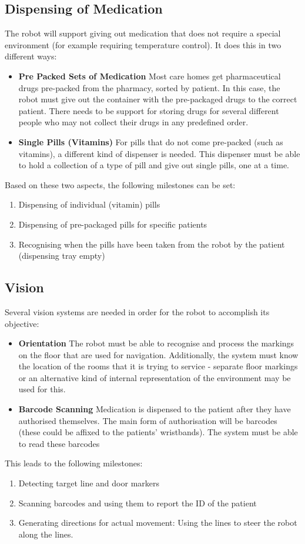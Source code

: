 \documentclass[a4paper,10pt,DIV10,openright,openbib]{scrreprt}
\begin{document}
\subsection{Dispensing of Medication}
The robot will support giving out medication that does not require a special environment
(for example requiring temperature control). It does this in two different ways:
\begin{itemize}
  \item \textbf{Pre Packed Sets of Medication} Most care homes get pharmaceutical drugs
pre-packed from the pharmacy, sorted by patient. In this case, the robot must
give out the container with the pre-packaged drugs to the correct patient. There
needs to be support for storing drugs for several different people who may not
collect their drugs in any predefined order.
  \item \textbf{Single Pills (Vitamins)} For pills that do not come pre-packed
(such as vitamins), a different kind of dispenser is needed. This dispenser must be able to hold a collection 
of a type of pill and give out single pills, one at a time.
\end{itemize}
Based on these two aspects, the following milestones can be set:
\begin{enumerate}
  \item Dispensing of individual (vitamin) pills
  \item Dispensing of pre-packaged pills for specific patients
  \item Recognising when the pills have been taken from the robot by the patient
    (dispensing tray empty)
\end{enumerate}

\subsection{Vision}
Several vision systems are needed in order for the robot to accomplish its objective:
\begin{itemize}
  \item \textbf{Orientation}
The robot must be able to recognise and process the markings on the floor that
are used for navigation. Additionally, the system must know the location of the rooms that
it is trying to service - separate floor markings or an alternative kind of
internal representation of the environment may be used for this.
  \item \textbf{Barcode Scanning}
Medication is dispensed to the patient after they have authorised themselves.
The main form of authorisation will be barcodes (these could be affixed to the
patients' wristbands). The system must be able to read these barcodes
\end{itemize}
This leads to the following milestones:
\begin{enumerate}
  \item Detecting target line and door markers
  \item Scanning barcodes and using them to report the ID of the patient
  \item Generating directions for actual movement: Using the lines to steer the
    robot along the lines.
\end{enumerate}
\end{document}
